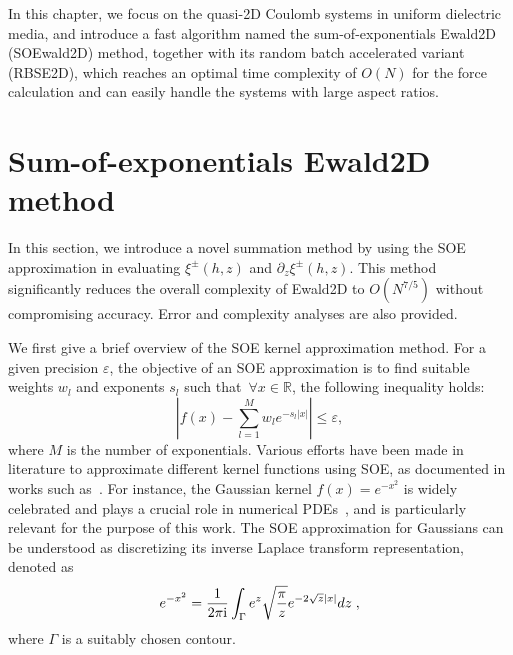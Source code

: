 In this chapter, we focus on the quasi-2D Coulomb systems in uniform dielectric media, and introduce a fast algorithm named the sum-of-exponentials Ewald2D (SOEwald2D) method, together with its random batch accelerated variant (RBSE2D), which reaches an optimal time complexity of $O(N)$ for the force calculation and can easily handle the systems with large aspect ratios.

\section{Sum-of-exponentials Ewald2D method} \label{sec:method}

In this section, we introduce a novel summation method by using the SOE approximation in evaluating $\xi^{\pm}(h,z)$ and $\partial_{z}\xi^{\pm}(h,z)$. 
This method significantly reduces the overall complexity of Ewald2D to $O(N^{7/5})$ without compromising accuracy. 
Error and complexity analyses are also provided.

We first give a brief overview of the SOE kernel approximation method.  
For a given precision $\varepsilon$, the objective of an SOE approximation is to find suitable weights $w_l$ and exponents $s_l$ such that~$\forall x \in \mathbb{R}$, the following inequality holds:
\begin{equation}\label{eq::SOE1}
	\left|f(x)-\sum_{l=1}^M w_l e^{-s_l|x|}\right|\leq \varepsilon,
\end{equation}
where $M$ is the number of exponentials. 
Various efforts have been made in literature to approximate different kernel functions using SOE, as documented in works such as~\cite{wiscombe1977exponential, evans1980least, jiang2008efficient, beylkin2005approximation, beylkin2010approximation}.
For instance, the Gaussian kernel $f(x)=e^{-x^2}$ is widely celebrated and plays a crucial role in numerical PDEs~\cite{weideman2010improved,wang2018adaptive}, and is particularly relevant for the purpose of this work. 
The SOE approximation for Gaussians can be understood as discretizing its inverse Laplace transform representation, denoted as
\begin{equation}\label{eq:inverse_laplace}
	e^{-x^2} = \frac{1}{2 \pi \mathrm{i}} \int_{\Gamma} e^{z} \sqrt{\frac{\pi}{z}} e^{-2\sqrt{z}\lvert x\rvert} dz\;,
\end{equation}
where $\Gamma$ is a suitably chosen contour. 

